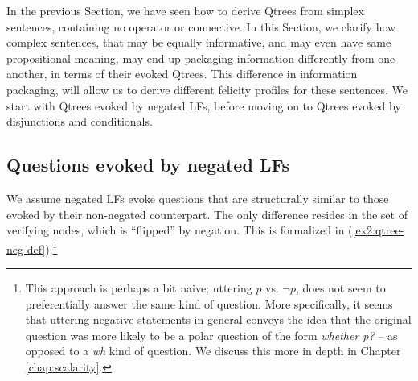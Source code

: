 In the previous Section, we have seen how to derive Qtrees from simplex sentences, containing no operator or connective. In this Section, we clarify how complex sentences, that may be equally informative, and may even have same propositional meaning, may end up packaging information differently from one another, in terms of their evoked Qtrees. This difference in information packaging, will allow us to derive different felicity profiles for these sentences. We start with Qtrees evoked by negated LFs, before moving on to Qtrees evoked by disjunctions and conditionals.

\subsection{Questions evoked by negated LFs}\label{sec:neg}
We assume negated LFs evoke questions that are structurally similar to those evoked by their non-negated counterpart. The only difference resides in the set of verifying nodes, which is ``flipped'' by negation. This is formalized in (\ref{ex2:qtree-neg-def}).\footnote{This approach is perhaps a bit naive; uttering $p$ vs. $\neg p$, does not seem to preferentially answer the same kind of question. More specifically, it seems that uttering negative statements in general conveys the idea that the original question was more likely to be a polar question of the form \textit{whether p?} -- as opposed to a \textit{wh} kind of question. We discuss this more in depth in Chapter \ref{chap:scalarity}.}

\begin{exe}
	\label{ex2:qtree-neg-def}
\end{exe}

